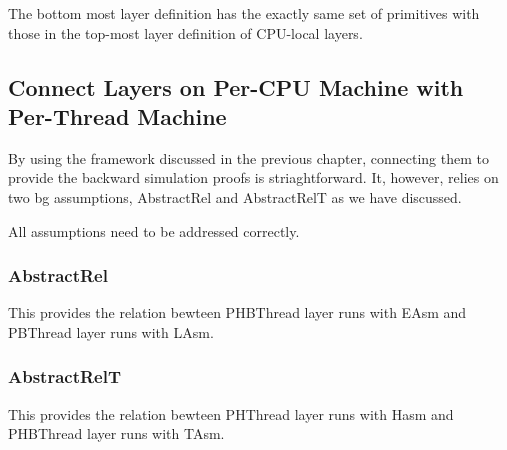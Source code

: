 The bottom most layer definition has the exactly same set of primitives with those in 
the top-most layer definition of CPU-local layers. 

\subsection{Connect Layers on Per-CPU Machine with Per-Thread Machine}
\label{chapter:certikos:subsec:multithreaded-connect}

By using the framework discussed in the previous chapter, connecting them to provide the backward simulation proofs is striaghtforward.
It, however, relies on two bg assumptions, 
AbstractRel and AbstractRelT as we have discussed. 

All assumptions need to be addressed correctly.

\subsubsection{AbstractRel}

This provides the relation bewteen PHBThread layer runs with EAsm and PBThread layer runs with LAsm. 

\subsubsection{AbstractRelT}

This provides the relation bewteen PHThread layer runs with Hasm and PHBThread layer runs with TAsm. 






